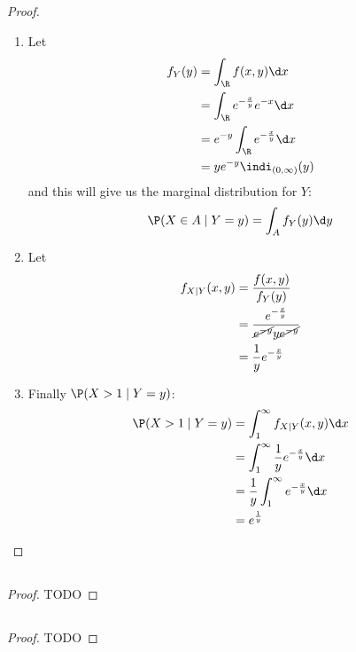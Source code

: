 \subsection{}
\begin{proof}
	\begin{enumerate}
		\item Let
		\begin{align*}
			f_Y(y) &= \int_{\R} f(x,y) \d x\\
			&= \int_{\R} e^{- \frac{x}{y}}e^{-x}\d x\\
			&= e^{-y}\int_{\R} e^{-\frac{x}{y}} \d x\\
			&= y e^{-y}\indi_{(0,\infty)}(y) %
		\end{align*}
		and this will give us the marginal distribution for $Y$:
		\[
			\P(X\in A \mid Y=y) = \int_A f_Y(y)\d y
		\]
		\item Let
		\begin{align*}
			f_{X\mid Y}(x,y) &= \frac{f(x,y)}{f_Y(y)}\\
			&= \frac{e^{-\frac{x}{y}}}{\cancel{e^{-y}}{y\cancel{e^{-y}}}}\\
			&= \frac{1}{y}e^{-\frac{x}{y}}
		\end{align*}
		\item Finally $\P(X>1 \mid Y=y)$:
		\begin{align*}
			\P(X>1\mid Y=y) &= \int_1^{\infty} f_{X\mid Y}(x,y)\d x\\
			&= \int_1^{\infty} \frac{1}{y} e^{-\frac{x}{y}}\d x\\
			&= \frac{1}{y} \int_1^{\infty} e^{-\frac{x}{y}} \d x\\
			&= e^{\frac{1}{y}}
		\end{align*}
	\end{enumerate}
\end{proof}
\subsection{}
\begin{proof}
	TODO	
\end{proof}

\subsection{}
\begin{proof}
	TODO
\end{proof}

%	
